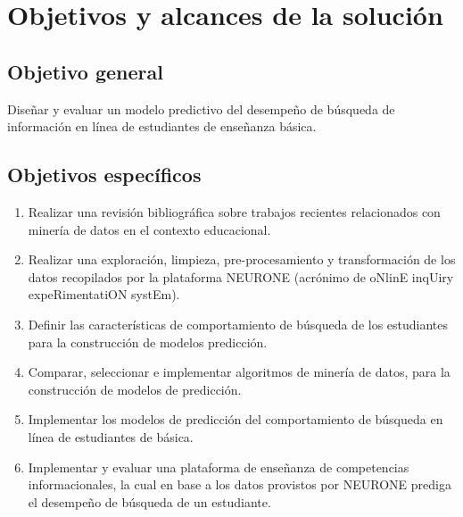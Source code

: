 \chapter{Objetivos y alcances de la solución}
\label{chp:objetivos}
\setcounter{page}{1}

\section{Objetivo general}
\label{sec:objetivo-general}
Diseñar y evaluar un modelo predictivo del desempeño de búsqueda de información en línea de estudiantes de enseñanza básica.

\section{Objetivos específicos}
\label{sec:objetivo-especificos}

\begin{enumerate}
	\item Realizar una revisión bibliográfica sobre trabajos recientes relacionados con minería de datos en el contexto educacional.
	\item Realizar una exploración, limpieza, pre-procesamiento y transformación de los datos recopilados por la plataforma NEURONE (acrónimo de oNlinE inqUiry expeRimentatiON systEm).
	\item Definir las características de comportamiento de búsqueda de los estudiantes para la construcción de modelos predicción.
	\item Comparar, seleccionar e implementar algoritmos de minería de datos, para la construcción de modelos de predicción.
	\item Implementar los modelos de predicción del comportamiento de búsqueda en línea de estudiantes de básica.
	\item Implementar y evaluar una plataforma de enseñanza de competencias informacionales, la cual en base a los datos provistos por NEURONE prediga el desempeño de búsqueda de un estudiante.
\end{enumerate}